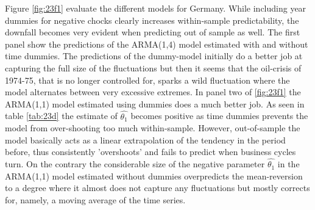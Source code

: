 Figure \ref{fig:23f1} evaluate the different models for Germany. While including year dummies for negative chocks clearly increases within-sample predictability, the downfall becomes very evident when predicting out of sample as well. The first panel show the predictions of the ARMA(1,4) model estimated with and without time dummies. The predictions of the dummy-model initially do a better job at capturing the full size of the fluctuations but then it seems that the oil-crisis of 1974-75, that is no longer controlled for, sparks a wild fluctuation where the model alternates between very excessive extremes. In panel two of \ref{fig:23f1} the ARMA(1,1) model estimated using dummies does a much better job. As seen in table \ref{tab:23d} the estimate of $\hat{\theta_1}$ becomes positive as time dummies prevents the model from over-shooting too much within-sample. However, out-of-sample the model basically acts as a linear extrapolation of the tendency in the period before, thus consistently 'overshoots' and fails to predict when business cycles turn. On the contrary the considerable size of the negative parameter $\hat{\theta_1}$ in the ARMA(1,1) model estimated without dummies overpredicts the mean-reversion to a degree where it almost does not capture any fluctuations but mostly corrects for, namely, a moving average of the time series.

